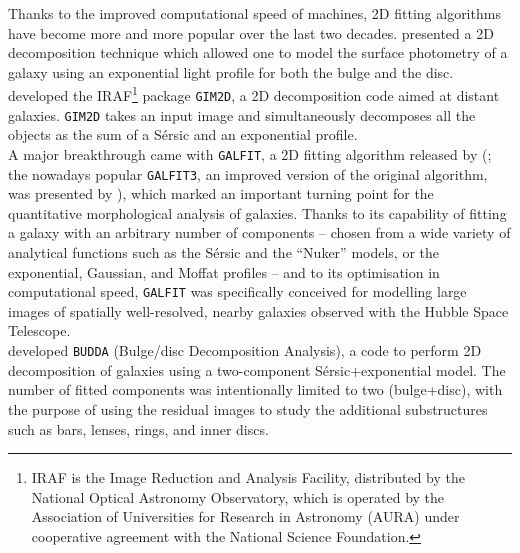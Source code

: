 Thanks to the improved computational speed of machines, 
2D fitting algorithms have become more and more popular over the last two decades. 
\cite{dejong1996} presented a 2D decomposition technique 
which allowed one to model the surface photometry of a galaxy 
using an exponential light profile for both the bulge and the disc. 
\cite{simard1998} developed the IRAF\footnote{IRAF is the Image Reduction and Analysis Facility, 
distributed by the National Optical Astronomy Observatory, 
which is operated by the Association of Universities for Research in Astronomy (AURA) 
under cooperative agreement with the National Science Foundation.} package {\tt GIM2D}, 
a 2D decomposition code aimed at distant galaxies. 
{\tt GIM2D} takes an input image and simultaneously decomposes all the objects 
as the sum of a S\'ersic and an exponential profile. \\

A major breakthrough came with {\tt GALFIT}, 
a 2D fitting algorithm released by \citeauthor{peng2002} (\citeyear{peng2002}; 
the nowadays popular {\tt GALFIT3}, an improved version of the original algorithm, was presented by \citealt{peng2010}), 
which marked an important turning point for the quantitative morphological analysis of galaxies. 
Thanks to its capability of fitting a galaxy with an arbitrary number of components 
-- chosen from a wide variety of analytical functions such as the S\'ersic and the ``Nuker'' models, 
or the exponential, Gaussian, and Moffat profiles -- 
and to its optimisation in computational speed, 
{\tt GALFIT} was specifically conceived for modelling large images of spatially well-resolved, 
nearby galaxies observed with the Hubble Space Telescope. \\

\cite{desouza2004} developed {\tt BUDDA} (Bulge/disc Decomposition Analysis), 
a code to perform 2D decomposition of galaxies using a two-component S\'ersic+exponential model. 
The number of fitted components was intentionally limited to two (bulge+disc), 
with the purpose of using the residual images 
to study the additional substructures such as bars, lenses, rings, and inner discs. \\

